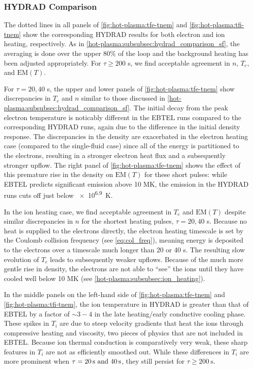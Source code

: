 \subsubsection{HYDRAD Comparison}\label{hot-plasma:subsubsec:hydrad_comparison_tf}

The dotted lines in all panels of \autoref{fig:hot-plasma:tfe-tnem} and \autoref{fig:hot-plasma:tfi-tnem} show the corresponding HYDRAD results for both electron and ion heating, respectively. As in \autoref{hot-plasma:subsubsec:hydrad_comparison_sf}, the averaging is done over the upper 80\% of the loop and the background heating has been adjusted appropriately. For $\tau\ge200$ s, we find acceptable agreement in $n$, $T_e$, and $\mathrm{EM}(T)$.

For $\tau=20,40$ s, the upper and lower panels of \autoref{fig:hot-plasma:tfe-tnem} show discrepancies in $T_e$ and $n$ similar to those discussed in \autoref{hot-plasma:subsubsec:hydrad_comparison_sf}. The initial decay from the peak electron temperature is noticably different in the EBTEL runs compared to the corresponding HYDRAD runs, again due to the difference in the initial density response. The discrepancies in the density are exacerbated in the electron heating case (compared to the single-fluid case) since all of the energy is partitioned to the electrons, resulting in a stronger electron heat flux and a subsequently stronger upflow. The right panel of \autoref{fig:hot-plasma:tfe-tnem} shows the effect of this premature rise in the density on $\mathrm{EM}(T)$ for these short pulses: while EBTEL predicts significant emission above 10 MK, the emission in the HYDRAD runs cuts off just below \SI{e6.9}{\kelvin}.

In the ion heating case, we find acceptable agreement in $T_e$ and $\mathrm{EM}(T)$ despite similar discrepancies in $n$ for the shortest heating pulses, $\tau=20,40$ s. Because no heat is supplied to the electrons directly, the electron heating timescale is set by the Coulomb collision frequency (see \autoref{eq:col_freq}), meaning energy is deposited to the electrons over a timescale much longer than 20 or 40 s. The resulting slow evolution of $T_e$ leads to subsequently weaker upflows. Because of the much more gentle rise in density, the electrons are not able to ``see'' the ions until they have cooled well below 10 MK (see \autoref{hot-plasma:subsubsec:ion_heating}).

In the middle panels on the left-hand side of \autoref{fig:hot-plasma:tfe-tnem} and \autoref{fig:hot-plasma:tfi-tnem}, the ion temperature in HYDRAD is greater than that of EBTEL by a factor of $\sim3-4$ in the late heating/early conductive cooling phase. These spikes in $T_i$ are due to steep velocity gradients that heat the ions through compressive heating and viscosity, two pieces of physics that are not included in EBTEL. Because ion thermal conduction is comparatively very weak, these sharp features in $T_i$ are not as efficiently smoothed out. While these differences in $T_i$ are more prominent when $\tau=\SIlist[list-final-separator = {,}]{20;40}{\second}$, they still persist for $\tau\ge\SI{200}{\second}$.

